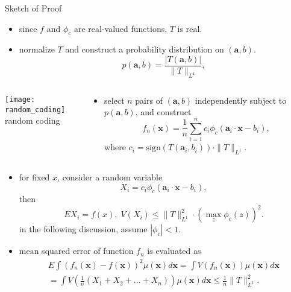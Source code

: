 \documentclass[fleqn,aspectratio=1610]{beamer}
\begin{document}
\begin{frame}[allowframebreaks]{Sketch of Proof}
\begin{itemize}
\item since \(f\) and \(\phi_{c}\) are real-valued functions,
\(T\) is real.
\item normalize \(T\)
and construct a probability distribution on \((\boldsymbol{a},b)\).
\begin{equation}
  p(\boldsymbol{a},b)=\frac{|T(\boldsymbol{a},b)|}{\|T\|_{L^{1}}},
\end{equation}
\end{itemize}
\begin{columns}
\begin{column}{0.45\columnwidth}
\begin{center}
\texttt{[image: random\_coding]}\\[0pt]
random coding
\end{center}
\end{column}
\begin{column}{0.55\columnwidth}
\begin{itemize}
\item select \(n\) pairs of \((\boldsymbol{a},b)\) independently
subject to \(p(\boldsymbol{a},b)\),
and construct
\begin{equation}
  f_{n}(\boldsymbol{x})=\frac{1}{n}\sum_{i=1}^{n}
  c_i\phi_{c}(\boldsymbol{a}_{i}\cdot\boldsymbol{x}-b_{i}),
\end{equation}
where \(c_i=\mathrm{sign}(T(\boldsymbol{a}_{i},b_{i}))\cdot\|T\|_{L^1}\).
\end{itemize}
\end{column}
\end{columns}
\pagebreak
\begin{itemize}
\item for fixed \(x\), consider a random variable
\begin{equation}
  X_i=c_i\phi_{c}(\boldsymbol{a}_{i}\cdot\boldsymbol{x}-b_{i}),
\end{equation}
then
\begin{equation}
  EX_i=f(x),\; V(X_i)\leq\|T\|_{L^1}^2
  \cdot\left(\max_{z}\phi_c(z)\right)^2.
\end{equation}
in the following discussion, assume \(|\phi_{c}|<1\).
\item mean squared error of function \(f_n\) is evaluated as
\begin{multline}
  E\int(f_{n}(\boldsymbol{x})-f(\boldsymbol{x}))^{2}
  \mu(\boldsymbol{x})d\boldsymbol{x}
  =\int V(f_n(\boldsymbol{x}))
  \mu(\boldsymbol{x})d\boldsymbol{x}\\
  =\int V\left(\frac{1}{n}(X_1+X_2+\dots+X_n)\right)
  \mu(\boldsymbol{x})d\boldsymbol{x}
  \leq\frac{1}{n}\|T\|_{L^1}^2.
\end{multline}
\end{itemize}
\end{frame}
\end{document}
